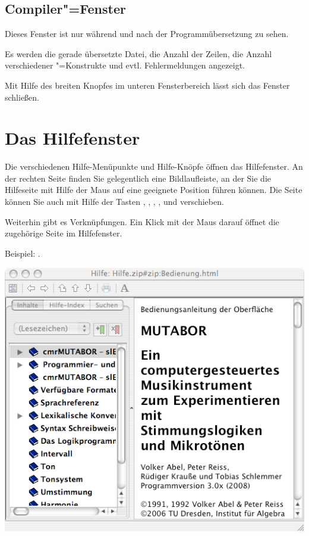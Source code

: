 \section{Compiler"=Fenster}\label{sec:DE_COMP}
Dieses Fenster ist nur während und nach der Programmübersetzung 
zu sehen.

Es werden die gerade übersetzte Datei, die Anzahl der Zeilen, 
die Anzahl verschiedener \mutabor{}"=Konstrukte und evtl. Fehlermeldungen 
angezeigt.

Mit Hilfe des breiten Knopfes im unteren Fensterbereich lässt 
sich das Fenster schließen.

\chapter{Das Hilfefenster}\label{sec:HELPWINDOW}

Die verschiedenen Hilfe-Menüpunkte und Hilfe-Knöpfe öffnen das
Hilfefenster. An der rechten Seite finden Sie gelegentlich eine
Bildlaufleiste, an der Sie die Hilfeseite mit Hilfe der Maus auf eine
geeignete Position führen können. Die Seite können Sie auch mit Hilfe
der Tasten \LArrow, \UArrow, \DArrow, \RArrow, \PgUp{} und \PgDown{}
verschieben.

Weiterhin gibt es Verknüpfungen. Ein Klick mit der Maus darauf öffnet die 
zugehörige Seite im Hilfefenster. 

Beispiel: .

\ifhtml
{}
\else
\includegraphics{Hilfefenster}
\fi

